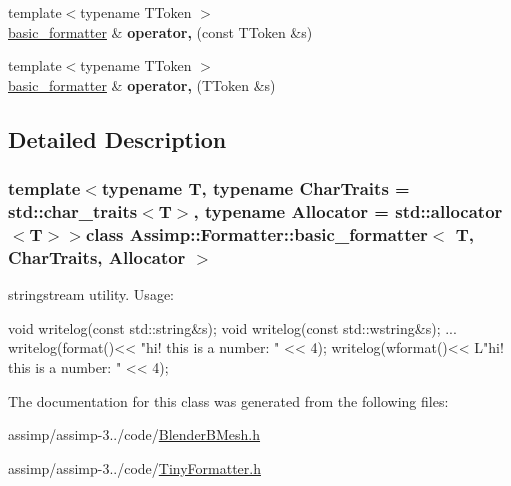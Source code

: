 \begin{DoxyCompactItemize}
\item 
\hypertarget{singleton_assimp_1_1_formatter_1_1basic__formatter_a3503417c40ad2fd1e42c17ca68059a30}{{\footnotesize template$<$typename T\+Token $>$ }\\\hyperlink{singleton_assimp_1_1_formatter_1_1basic__formatter}{basic\+\_\+formatter} \& {\bfseries operator,} (const T\+Token \&s)}\label{singleton_assimp_1_1_formatter_1_1basic__formatter_a3503417c40ad2fd1e42c17ca68059a30}

\item 
\hypertarget{singleton_assimp_1_1_formatter_1_1basic__formatter_a46ae57770da014023a1cffb0cafe0f51}{{\footnotesize template$<$typename T\+Token $>$ }\\\hyperlink{singleton_assimp_1_1_formatter_1_1basic__formatter}{basic\+\_\+formatter} \& {\bfseries operator,} (T\+Token \&s)}\label{singleton_assimp_1_1_formatter_1_1basic__formatter_a46ae57770da014023a1cffb0cafe0f51}

\end{DoxyCompactItemize}


\subsection{Detailed Description}
\subsubsection*{template$<$typename T, typename Char\+Traits = std\+::char\+\_\+traits$<$\+T$>$, typename Allocator = std\+::allocator$<$\+T$>$$>$class Assimp\+::\+Formatter\+::basic\+\_\+formatter$<$ T, Char\+Traits, Allocator $>$}

stringstream utility. Usage\+: 
\begin{DoxyCode}
\textcolor{keywordtype}{void} writelog(\textcolor{keyword}{const} std::string&s);
\textcolor{keywordtype}{void} writelog(\textcolor{keyword}{const} std::wstring&s);
...
writelog(format()<< \textcolor{stringliteral}{"hi! this is a number: "} << 4);
writelog(wformat()<< L\textcolor{stringliteral}{"hi! this is a number: "} << 4);
\end{DoxyCode}
 

The documentation for this class was generated from the following files\+:\begin{DoxyCompactItemize}
\item 
assimp/assimp-\/3../code/\hyperlink{_blender_b_mesh_8h}{Blender\+B\+Mesh.\+h}\item 
assimp/assimp-\/3../code/\hyperlink{_tiny_formatter_8h}{Tiny\+Formatter.\+h}\end{DoxyCompactItemize}
